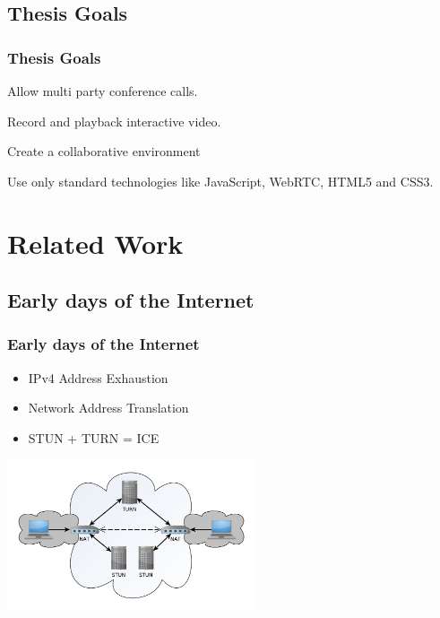\documentclass[compress]{beamer}
\begin{document}
		
	

	\subsection{Thesis Goals} %
  		\begin{frame}[c]
		\frametitle{Thesis Goals}
		Allow multi party conference calls.

		\vfill
		
		Record and playback interactive video.
		
		\vfill

        Create a collaborative environment        

        \vfill

		Use only standard technologies like JavaScript, WebRTC, HTML5 and CSS3.


		\end{frame}


\section{Related Work}\label{related}


	\subsection{Early days of the Internet}\label{early}


  		\begin{frame}[c]
		\frametitle{Early days of the Internet}
		\begin{itemize}
		\item IPv4 Address Exhaustion
		\vfill
		\item Network Address Translation	
		\vfill
		\item STUN + TURN = ICE
		\end{itemize}
		\begin{flushright}

			\vspace*{-6\baselineskip}
			\includegraphics[width=0.55\textwidth]{figures/ice.pdf}
		\end{flushright}
		
		\end{frame}
\end{document}
